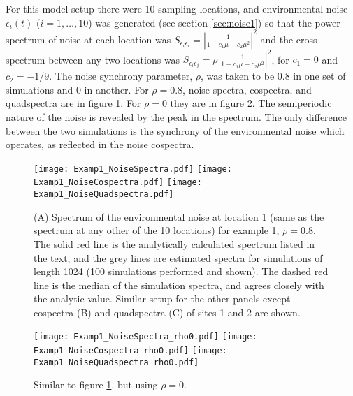 \documentclass[letterpaper,11pt]{article}
\begin{document}
For this model setup there were 10 sampling locations, and environmental noise $\epsilon_i(t)$
($i=1,\ldots,10$) was generated
(see section \ref{sec:noise1}) so that the power spectrum of noise at each location was 
$S_{\epsilon_i \epsilon_i} = \left| \frac{1}{1-c_1 \mu -c_2 \mu^2} \right|^2$ and
the cross spectrum between any two locations was 
$S_{\epsilon_i \epsilon_j}=\rho \left| \frac{1}{1-c_1 \mu -c_2 \mu^2} \right|^2$, for $c_1=0$ and $c_2=-1/9$. The noise synchrony parameter, $\rho$, was taken to be 
$0.8$ in one set of simulations and $0$ in another. For $\rho=0.8$, 
noise spectra, cospectra, and quadspectra are in figure \ref{fig:example1_noise_spectra_rho0p8}. 
For $\rho=0$ they are in figure \ref{fig:example1_noise_spectra_rho0}.
The semiperiodic nature of the noise
is revealed by the peak in the spectrum.
The only difference between the two simulations is the synchrony of the 
environmental noise which operates, as reflected in the noise cospectra.

\begin{figure}
\texttt{[image: Examp1\_NoiseSpectra.pdf]}
\texttt{[image: Examp1\_NoiseCospectra.pdf]}
\texttt{[image: Examp1\_NoiseQuadspectra.pdf]}
\caption{(A) Spectrum of the environmental noise at location 1 (same as the spectrum at any other of the 10 locations) for example 1, $\rho=0.8$. The solid red line is the analytically calculated spectrum listed in the text, and the grey lines are estimated spectra for simulations of length 1024 (100 simulations performed and shown). The dashed red line is the median of the simulation spectra, and agrees closely with the analytic value. Similar setup for
 the other panels except cospectra (B) and quadspectra (C) of sites 1 and 2 are shown. }\label{fig:example1_noise_spectra_rho0p8}
\end{figure}

\begin{figure}
\texttt{[image: Examp1\_NoiseSpectra\_rho0.pdf]}
\texttt{[image: Examp1\_NoiseCospectra\_rho0.pdf]}
\texttt{[image: Examp1\_NoiseQuadspectra\_rho0.pdf]}
\caption{Similar to figure \ref{fig:example1_noise_spectra_rho0p8}, but using $\rho=0$.}\label{fig:example1_noise_spectra_rho0}
\end{figure}
\end{document}
